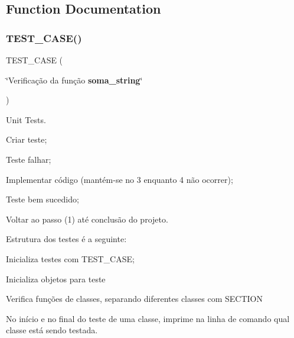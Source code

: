 \subsection{Function Documentation}
\mbox{\label{testa__string__soma_8cpp_a012d693008827f2e341a0a87d32cf9e6}} 
\subsubsection{T\+E\+S\+T\+\_\+\+C\+A\+S\+E()}
{\footnotesize\ttfamily T\+E\+S\+T\+\_\+\+C\+A\+SE (\begin{DoxyParamCaption}\item[{\char`\"{}Verificação da função \textbf{ soma\+\_\+string}\char`\"{}}]{ }\end{DoxyParamCaption})}



Unit Tests. 


\begin{DoxyEnumerate}
\item Criar teste;
\item Teste falhar;
\item Implementar código (mantém-\/se no 3 enquanto 4 não ocorrer);
\item Teste bem sucedido;
\item Voltar ao passo (1) até conclusão do projeto.
\end{DoxyEnumerate}

Estrutura dos testes é a seguinte\+:
\begin{DoxyEnumerate}
\item Inicializa testes com T\+E\+S\+T\+\_\+\+C\+A\+SE;
\item Inicializa objetos para teste
\item Verifica funções de classes, separando diferentes classes com S\+E\+C\+T\+I\+ON
\item No início e no final do teste de uma classe, imprime na linha de comando qual classe está sendo testada. 
\end{DoxyEnumerate}